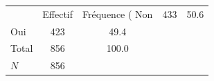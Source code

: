 {
\def\sym#1{\ifmmode^{#1}\else\(^{#1}\)\fi}
\begin{tabular}{l*{1}{cc}}
\toprule
            &    Effectif&Fréquence (%
\midrule
Non         &         433&        50.6\\
Oui         &         423&        49.4\\
Total       &         856&       100.0\\
\midrule
\(N\)       &         856&            \\
\bottomrule
\end{tabular}
}
